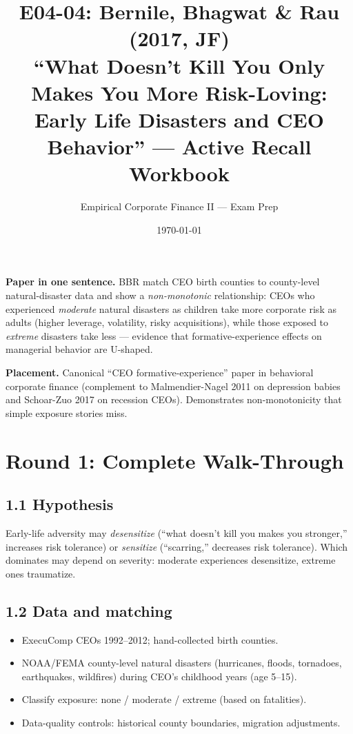 \documentclass[11pt]{article}
\title{E04-04: Bernile, Bhagwat \& Rau (2017, JF) \\
\large ``What Doesn't Kill You Only Makes You More Risk-Loving: Early Life Disasters and CEO Behavior'' --- Active Recall Workbook}
\author{Empirical Corporate Finance II --- Exam Prep}
\date{\today}
\begin{document}
\maketitle

\begin{keybox}
\textbf{Paper in one sentence.} BBR match CEO birth counties to county-level natural-disaster data and show a \emph{non-monotonic} relationship: CEOs who experienced \emph{moderate} natural disasters as children take more corporate risk as adults (higher leverage, volatility, risky acquisitions), while those exposed to \emph{extreme} disasters take less --- evidence that formative-experience effects on managerial behavior are U-shaped.

\textbf{Placement.} Canonical ``CEO formative-experience'' paper in behavioral corporate finance (complement to Malmendier-Nagel 2011 on depression babies and Schoar-Zuo 2017 on recession CEOs). Demonstrates non-monotonicity that simple exposure stories miss.
\end{keybox}

\section*{Round 1: Complete Walk-Through}

\subsection*{1.1 Hypothesis}
Early-life adversity may \emph{desensitize} (``what doesn't kill you makes you stronger,'' increases risk tolerance) or \emph{sensitize} (``scarring,'' decreases risk tolerance). Which dominates may depend on severity: moderate experiences desensitize, extreme ones traumatize.

\subsection*{1.2 Data and matching}
\begin{itemize}
\item ExecuComp CEOs 1992--2012; hand-collected birth counties.
\item NOAA/FEMA county-level natural disasters (hurricanes, floods, tornadoes, earthquakes, wildfires) during CEO's childhood years (age 5--15).
\item Classify exposure: none / moderate / extreme (based on fatalities).
\item Data-quality controls: historical county boundaries, migration adjustments.
\end{itemize}
\end{document}

